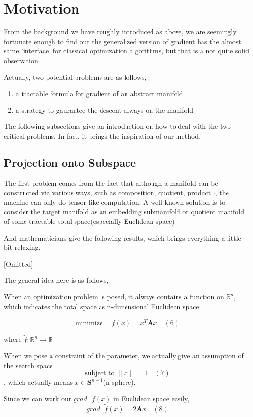 \documentclass[letterpaper]{article}
\begin{document}
\section{Motivation}
From the background we have roughly introduced as above, we are seemingly fortunate enough to find out the generalized version of gradient has the almost same 'interface' for classical optimization algorithms, but
that is a not quite solid observation.

Actually, two potential problems are as follows,
\begin{enumerate}
  \item a tractable formula for gradient of an abstract manifold
  \item a strategy to gaurantee the descent always on the manifold
\end{enumerate}

The following subsections give an introduction on how to deal with the two critical problems. In fact, it brings the inspiration of our method.

\subsection{Projection onto Subspace}
The first problem comes from the fact that although a manifold can be constructed via various ways, such as composition, quotient, product $\cdot$, the machine can only
do tensor-like computation. A well-known solution is to consider the target manifold as an embedding submanifold or quotient manifold of some tractable total space(especially Euclidean space)

And mathematicians give the following results, which brings everything a little bit relaxing.

[Omitted]

The general idea here is as follows,

When an optimization problem is posed, it always contains a function on $\mathbb{R}^n$, which indicates the total space as n-dimensional Euclidean space.

$$
   \text{minimize } \quad \tilde{f}(x)=x^{T}\mathbf{A}x \quad (6)
$$

where $\tilde{f}:\mathbb{R}^n\to\mathbb{R}$

When we pose a constraint of the parameter, we actually give an assumption of the search space
$$
  \text{subject to } \|x\|=1 \quad (7)
$$
, which actually means $x\in\mathbf{S}^{n-1}$(n-sphere).

Since we can work our $grad\text{ }\tilde{f}(x)$ in Euclidean space easily,
$$
  grad\text{ }\tilde{f}(x)=2\mathbf{A}x \quad (8)
$$
\end{document}
